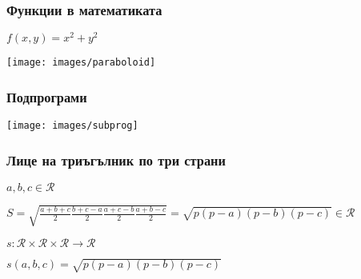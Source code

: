 \documentclass{beamer}
\begin{document}
\begin{frame}[fragile]
\frametitle{Функции в математиката}

$f(x,y) = x^2+y^2$

\begin{center}
\texttt{[image: images/paraboloid]}
\end{center}

\end{frame}




\begin{frame}[fragile]
\frametitle{Подпрограми}

\begin{center}
\texttt{[image: images/subprog]}
\end{center}


\end{frame}



\begin{frame}[fragile]
\frametitle{Лице на триъгълник по три страни}

\begin{flushleft}
$a,b,c \in \mathcal{R}$

$S = \sqrt{\frac{a+b+c}{2}\frac{b+c-a}{2}\frac{a+c-b}{2}\frac{a+b-c}{2}}=\sqrt{p(p-a)(p-b)(p-c)} \in \mathcal{R}$
\end{flushleft}

\pause

$s:\mathcal{R}\times\mathcal{R}\times\mathcal{R} \rightarrow \mathcal{R}$

\pause

$s(a,b,c)=\sqrt{p(p-a)(p-b)(p-c)}$


\end{frame}
\end{document}
